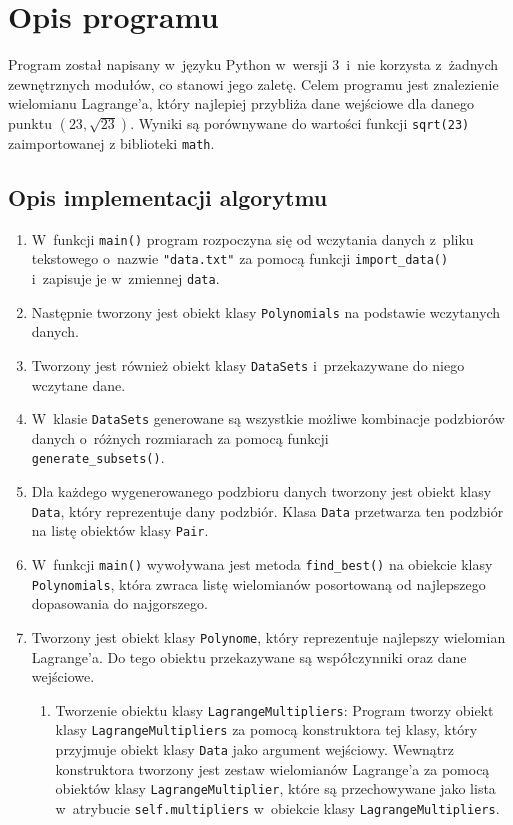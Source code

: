 \documentclass[12pt]{article}
\begin{document}
\section{Opis programu}
Program został napisany w~języku Python w~wersji 3~i~nie korzysta z~żadnych zewnętrznych modułów, co stanowi jego zaletę. Celem programu jest znalezienie wielomianu Lagrange'a, który najlepiej przybliża dane wejściowe dla danego punktu $(23,\sqrt{23})$. Wyniki są porównywane do wartości funkcji \texttt{sqrt(23)} zaimportowanej z biblioteki \texttt{math}.

\subsection{Opis implementacji algorytmu}

\begin{enumerate}
\item W~funkcji \verb|main()| program rozpoczyna się od wczytania danych z~pliku tekstowego o~nazwie \verb|"data.txt"| za pomocą funkcji \verb|import_data()| i~zapisuje je w~zmiennej \verb|data|.
\item Następnie tworzony jest obiekt klasy \verb|Polynomials| na podstawie wczytanych danych.
\item Tworzony jest również obiekt klasy \verb|DataSets| i~przekazywane do niego wczytane dane.
\item W~klasie \verb|DataSets| generowane są wszystkie możliwe kombinacje podzbiorów danych o~różnych rozmiarach za pomocą funkcji \\\verb|generate_subsets()|.
\item Dla każdego wygenerowanego podzbioru danych tworzony jest obiekt klasy \verb|Data|, który reprezentuje dany podzbiór. Klasa \verb|Data| przetwarza ten podzbiór na listę obiektów klasy \verb|Pair|.
\item W~funkcji \verb|main()| wywoływana jest metoda \verb|find_best()| na obiekcie klasy \verb|Polynomials|, która zwraca listę wielomianów posortowaną od najlepszego dopasowania do najgorszego.
\item Tworzony jest obiekt klasy \verb|Polynome|, który reprezentuje najlepszy wielomian Lagrange'a. Do tego obiektu przekazywane są współczynniki oraz dane wejściowe.
\begin{enumerate}
\item Tworzenie obiektu klasy \verb|LagrangeMultipliers|: Program tworzy obiekt klasy \verb|LagrangeMultipliers| za pomocą konstruktora tej klasy, który przyjmuje obiekt klasy \verb|Data| jako argument wejściowy. Wewnątrz konstruktora tworzony jest zestaw wielomianów Lagrange'a za pomocą obiektów klasy \verb|LagrangeMultiplier|, które są przechowywane jako lista w~atrybucie \verb|self.multipliers| w~obiekcie klasy \verb|LagrangeMultipliers|.

\end{enumerate}
\end{enumerate}
\end{document}
